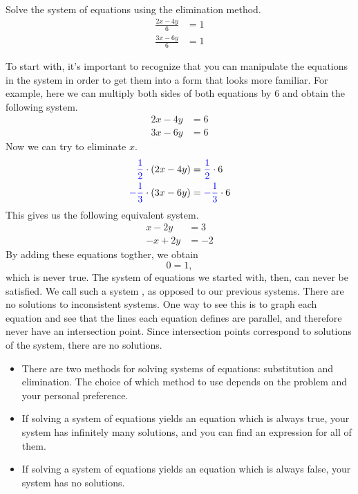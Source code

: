 \documentclass[nooutcomes]{ximera}
\begin{document}
\begin{example}
Solve the system of equations using the elimination method.
\begin{align*}
\frac{2x - 4y}{6} & = 1 \\
\frac{3x - 6y}{6} & = 1
\end{align*}
\begin{explanation}
To start with, it's important to recognize that you can manipulate the equations in the system in order to get them into a form that looks more familiar. For example, here we can multiply both sides of both equations by 6 and obtain the following system.
\begin{align*}
2x - 4y & = 6 \\
3x - 6y & = 6
\end{align*}
Now we can try to eliminate $x$. 
\begin{align*}
{\color{blue}{{\frac{1}{2}}}}\cdot (2x - 4y) & = {\color{blue}{{\frac{1}{2}}}}\cdot 6 \\
{\color{blue}{{-\frac{1}{3}}}}\cdot (3x - 6y) & = {\color{blue}{{-\frac{1}{3}}}}\cdot 6
\end{align*}
This gives us the following equivalent system.
\begin{align*}
x - 2y & = 3 \\
-x + 2y & = -2
\end{align*}
By adding these equations togther, we obtain
$$
0 = 1,
$$
which is never true. The system of equations we started with, then, can never be satisfied. We call such a system , as opposed to our previous  systems. There are no solutions to inconsistent systems. One way to see this is to graph each equation and see that the lines each equation defines are parallel, and therefore never have an intersection point. Since intersection points correspond to solutions of the system, there are no solutions. 
\end{explanation}
\end{example}

\begin{summary}
  \begin{itemize}
\item There are two methods for solving systems of equations: substitution and elimination. The choice of which method to use depends on the problem and your personal preference. 
\item If solving a system of equations yields an equation which is always true, your system has infinitely many solutions, and you can find an expression for all of them.
\item If solving a system of equations yields an equation which is always false, your system has no solutions. 
  \end{itemize}
\end{summary}
\end{document}
